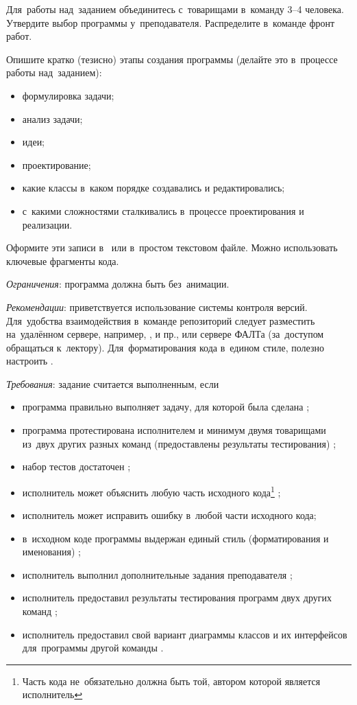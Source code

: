 \documentclass[a4paper,11pt,landscape,notitlepage,oneside,openany,final]{memoir}
\begin{document}
Для~работы над~заданием объединитесь с~товарищами в~команду 3--4 человека. Утвердите выбор программы у~преподавателя. Распределите в~команде фронт работ.

Опишите кратко (тезисно) этапы создания программы (делайте это в~процессе работы над~заданием):

\begin{itemize}
    \item формулировка задачи;
    \item анализ задачи;
    \item идеи;
    \item проектирование;
    \item какие классы в~каком порядке создавались и редактировались;
    \item с~какими сложностями сталкивались в~процессе проектирования и реализации.
\end{itemize}

Оформите эти записи в~\href{https://ru.wikipedia.org/wiki/Markdown}{} или в~простом текстовом файле. Можно использовать ключевые фрагменты кода.

\medskip

\emph{Ограничения}: программа должна быть без~анимации.

\medskip

\emph{Рекомендации}: приветствуется использование системы контроля версий. Для~удобства взаимодействия в~команде репозиторий следует разместить на~удалённом сервере, например, ,  и пр., или сервере ФАЛТа (за~доступом обращаться к~лектору).
Для~форматирования кода в~едином стиле, полезно настроить .

\medskip

\emph{Требования}: задание считается выполненным, если
\begin{itemize}
    \item программа правильно выполняет задачу, для которой была сделана ;
    \item программа протестирована исполнителем и минимум двумя товарищами из~двух других разных команд (предоставлены результаты тестирования) ;
    \item набор тестов достаточен ;
    \item исполнитель может объяснить любую часть исходного кода\footnote{Часть кода не~обязательно должна быть той, автором которой является исполнитель} ;
    \item исполнитель может исправить ошибку в~любой части исходного кода\footnotemark[\value{footnote}] ;
    \item в~исходном коде программы выдержан единый стиль (форматирования и именования) ;
    \item исполнитель выполнил дополнительные задания преподавателя ;
    \item исполнитель предоставил результаты тестирования программ двух других команд ;
    \item исполнитель предоставил свой вариант диаграммы классов и их интерфейсов для~программы другой команды .
\end{itemize}
\end{document}
